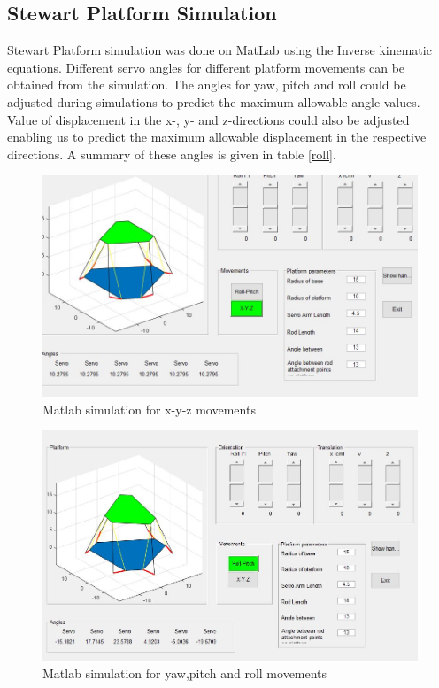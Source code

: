 \subsection{Stewart Platform Simulation}
Stewart Platform simulation was done on MatLab using the Inverse kinematic equations. Different servo angles for different platform movements can be obtained from the simulation. The angles for yaw, pitch and roll could be adjusted during simulations to predict the maximum allowable angle values. Value of displacement in the x-, y- and z-directions could also be adjusted enabling us to predict the maximum allowable displacement in the respective directions. A summary of these angles is given in table \ref{roll}.
\begin{center}
	\begin{figure}[H]
	\centering
	\includegraphics[width=0.75\linewidth]{Figures/Matlab}
	\caption[Linear displacements]{Matlab simulation for x-y-z movements}
	\end{figure}
\end{center}
\begin{center}
	\begin{figure}[H]
	\centering
	\includegraphics[width=0.75\linewidth]{Figures/Matlab2}
	\caption[Angular displacements]{Matlab simulation for yaw,pitch and roll movements}
	\end{figure}
\end{center}
